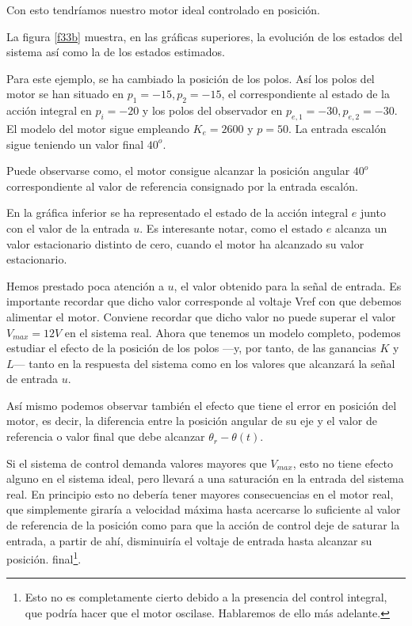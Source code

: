 \documentclass[10pt,a4paper]{report}
\begin{document}
Con esto tendríamos nuestro motor ideal controlado en posición. 

La figura \ref{f33b} muestra, en las gráficas superiores, la evolución de los estados del sistema así como la de los estados estimados. 

Para este ejemplo, se ha cambiado la posición de los polos. Así los polos del motor se han situado en $p_1 = -15, p_2 = -15$, el correspondiente al estado de la acción integral en $p_i = -20$ y los polos del observador en $p_{e,1} = -30, p_{e,2} = -30$. El modelo del motor sigue empleando $K_e = 2600$ y $p = 50$. La entrada escalón sigue teniendo un valor final $40^o$.

Puede observarse como, el motor consigue alcanzar la posición angular $40^o$ correspondiente al valor de referencia consignado por la entrada escalón.

En la gráfica inferior se ha representado el estado de la  acción integral $e$ junto con el valor de la entrada $u$. Es interesante notar, como el estado $e$ alcanza un valor estacionario distinto de cero, cuando el motor ha alcanzado su valor estacionario.

Hemos prestado poca atención a $u$, el valor obtenido para la señal de entrada. Es importante recordar que dicho valor corresponde al voltaje Vref con que debemos alimentar el motor.  Conviene recordar que dicho valor no puede superar el valor $V_{max}=12V$ en el sistema real. Ahora que tenemos un modelo completo, podemos estudiar el efecto de la posición de los polos ---y, por tanto, de las ganancias $K$ y $L$--- tanto en la respuesta del sistema como en los valores que alcanzará la señal de entrada $u$. 

Así mismo podemos observar también el efecto que tiene el error en posición del motor, es decir, la diferencia entre la posición angular de su eje y el valor de referencia o valor final que debe alcanzar $\theta_r-\theta(t)$.

Si el sistema de control demanda valores mayores que $V_{max}$, esto no tiene efecto alguno en el sistema ideal, pero llevará a una saturación en la entrada del sistema real. En principio esto no debería tener mayores consecuencias en el motor real, que simplemente giraría a velocidad máxima hasta acercarse lo suficiente al valor de referencia de la posición como para que la acción de control deje de saturar la entrada, a partir de ahí, disminuiría el voltaje de entrada hasta alcanzar su posición. final\footnote{Esto no es completamente cierto debido a la presencia del control integral, que podría hacer que el motor oscilase. Hablaremos de ello más adelante.}.
\end{document}
